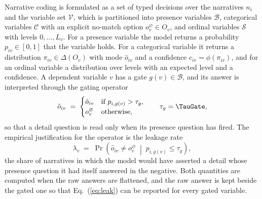 Narrative coding is formulated as a set of typed decisions over the narratives $n_i$ and the
variable set $\mathcal{V}$, which is partitioned into presence variables $\mathcal{B}$,
categorical variables $\mathcal{C}$ with an explicit no-match option
$o_v^{\varnothing} \in O_v$, and ordinal variables $\mathcal{S}$ with levels $0, \dots, L_v$.
For a presence variable the model returns a probability $p_{iv} \in [0,1]$ that the variable
holds. For a categorical variable it returns a distribution $\pi_{iv} \in \Delta(O_v)$ with
mode $\hat{o}_{iv}$ and a confidence $c_{iv} = \phi(\pi_{iv})$, and for an ordinal variable a
distribution over levels with an expected level and a confidence. A dependent variable $v$
has a gate $g(v) \in \mathcal{B}$, and its answer is interpreted through the gating operator
\begin{equation}
\tilde{o}_{iv} \;=\;
\begin{cases}
\hat{o}_{iv} & \text{if } p_{i,g(v)} > \tau_g,\\
o_v^{\varnothing} & \text{otherwise},
\end{cases}
\qquad \tau_g = \TauGate,
\label{eq:gate}
\end{equation}
so that a detail question is read only when its presence question has fired. The empirical
justification for the operator is the leakage rate
\begin{equation}
\lambda_v \;=\; \Pr\!\left(\hat{o}_{iv} \neq o_v^{\varnothing} \;\middle|\; p_{i,g(v)} \le \tau_g\right),
\label{eq:leak}
\end{equation}
the share of narratives in which the model would have asserted a detail whose presence
question it had itself answered in the negative. Both quantities are computed when the raw
answers are flattened, and the raw answer is kept beside the gated one so that
Eq.~(\ref{eq:leak}) can be reported for every gated variable.

